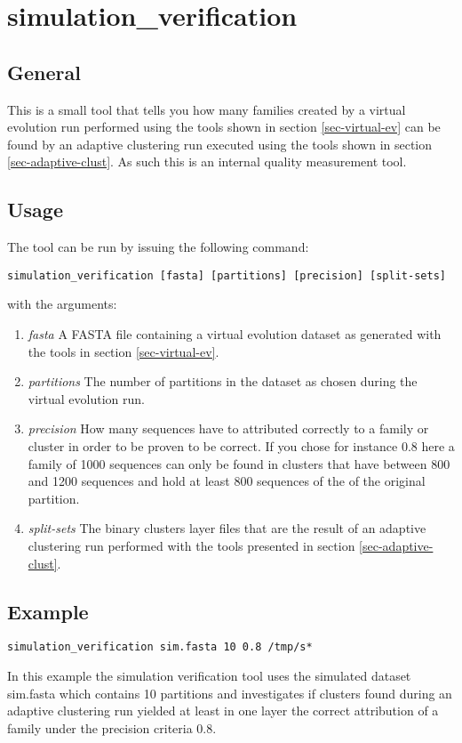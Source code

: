 \section{simulation\_verification}

\subsection{General}

This is a small tool that tells you how many families created by a virtual
evolution run performed using the tools shown in section
\ref{sec-virtual-ev} can be found by an adaptive clustering run executed using
the tools shown in section \ref{sec-adaptive-clust}. As such this is
an internal quality measurement tool.

\subsection{Usage}

The tool can be run by issuing the following command:

\begin{lstlisting}
simulation_verification [fasta] [partitions] [precision] [split-sets]
\end{lstlisting}
with the arguments:
\begin{enumerate}
  \item \emph{fasta} A FASTA file containing a virtual evolution
    dataset as generated with the tools in section
    \ref{sec-virtual-ev}.
  \item \emph{partitions} The number of partitions in the dataset as
    chosen during the virtual evolution run.
  \item \emph{precision} How many sequences have to attributed
    correctly to a family or cluster in order to be proven to be
    correct. If you chose for instance 0.8 here a family of 1000
    sequences can only be found in clusters that have between 800 and
    1200 sequences and hold at least 800 sequences of the of the
    original partition. 
  \item \emph{split-sets} The binary clusters layer files that are the
    result of an adaptive clustering run performed with the tools presented in
    section \ref{sec-adaptive-clust}.
\end{enumerate}

\subsection{Example}
\begin{lstlisting}
simulation_verification sim.fasta 10 0.8 /tmp/s*
\end{lstlisting}
In this example the simulation verification tool uses the simulated dataset
sim.fasta which contains 10 partitions and investigates if clusters found
during an adaptive clustering run yielded at least in one layer the correct
attribution of a family under the precision criteria 0.8.

